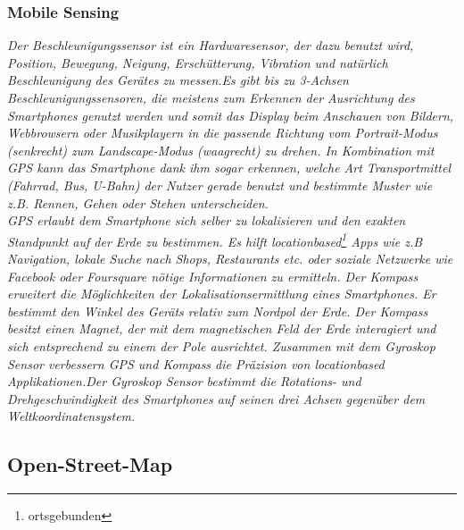 \subsubsection*{Mobile Sensing} \textit{Der Beschleunigungssensor ist ein Hardwaresensor, der dazu benutzt wird, Position, Bewegung, Neigung, Erschütterung, Vibration und natürlich Beschleunigung des Gerätes zu messen.Es gibt bis zu 3-Achsen Beschleunigungssensoren, die meistens zum Erkennen der Ausrichtung des \glspl{Smartphone} genutzt werden und somit das Display beim Anschauen von Bildern, Webbrowsern oder Musikplayern in die passende Richtung vom Portrait-Modus (senkrecht) zum Landscape-Modus (waagrecht) zu drehen. In Kombination mit \gls{GPS} kann das \gls{Smartphone} dank ihm sogar erkennen, welche Art Transportmittel (Fahrrad, Bus, U-Bahn) der Nutzer gerade benutzt und bestimmte Muster wie z.B. Rennen, Gehen oder Stehen unterscheiden.\\
\gls{GPS} erlaubt dem \gls{Smartphone} sich selber zu lokalisieren und den exakten Standpunkt auf der Erde zu bestimmen. Es hilft locationbased\footnote{ ortsgebunden} \Glspl{App} wie z.B Navigation, lokale Suche nach Shops, Restaurants etc. oder soziale Netzwerke wie Facebook oder Foursquare nötige Informationen zu ermitteln. Der Kompass erweitert die Möglichkeiten der Lokalisationsermittlung eines \gls{Smartphone}s. Er bestimmt den Winkel des Geräts relativ zum Nordpol der Erde. Der Kompass besitzt einen Magnet, der mit dem magnetischen Feld der Erde interagiert und sich entsprechend zu einem der Pole ausrichtet. Zusammen mit dem Gyroskop Sensor verbessern \gls{GPS} und Kompass die Präzision von locationbased Applikationen.Der Gyroskop Sensor bestimmt die Rotations- und Drehgeschwindigkeit des \gls{Smartphone}s auf seinen drei Achsen gegenüber dem Weltkoordinatensystem.}
\subsection{Open-Street-Map}
